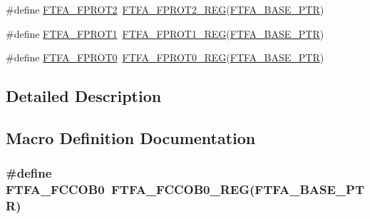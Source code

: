 \begin{DoxyCompactItemize}
\item 
\#define \hyperlink{group___f_t_f_a___register___accessor___macros_ga25a0859e528311bedda3719d80e44a59}{F\+T\+F\+A\+\_\+\+F\+P\+R\+O\+T2}~\hyperlink{group___f_t_f_a___register___accessor___macros_ga35897dbfbff1d92db497e4c553692eda}{F\+T\+F\+A\+\_\+\+F\+P\+R\+O\+T2\+\_\+\+R\+EG}(\hyperlink{group___f_t_f_a___peripheral_ga13ad52f12d5b04e5e01f69ab18ed9216}{F\+T\+F\+A\+\_\+\+B\+A\+S\+E\+\_\+\+P\+TR})
\item 
\#define \hyperlink{group___f_t_f_a___register___accessor___macros_ga6fa22ad27ded5b2e13a5b6dd22d6641d}{F\+T\+F\+A\+\_\+\+F\+P\+R\+O\+T1}~\hyperlink{group___f_t_f_a___register___accessor___macros_gad0a42e1dffbcc9f89f85c147c728fd3e}{F\+T\+F\+A\+\_\+\+F\+P\+R\+O\+T1\+\_\+\+R\+EG}(\hyperlink{group___f_t_f_a___peripheral_ga13ad52f12d5b04e5e01f69ab18ed9216}{F\+T\+F\+A\+\_\+\+B\+A\+S\+E\+\_\+\+P\+TR})
\item 
\#define \hyperlink{group___f_t_f_a___register___accessor___macros_gad1a0d6a372aec4a0f1b41e9f8d45f59b}{F\+T\+F\+A\+\_\+\+F\+P\+R\+O\+T0}~\hyperlink{group___f_t_f_a___register___accessor___macros_gacdd73daa0145621639c5a355bea59886}{F\+T\+F\+A\+\_\+\+F\+P\+R\+O\+T0\+\_\+\+R\+EG}(\hyperlink{group___f_t_f_a___peripheral_ga13ad52f12d5b04e5e01f69ab18ed9216}{F\+T\+F\+A\+\_\+\+B\+A\+S\+E\+\_\+\+P\+TR})
\end{DoxyCompactItemize}


\subsection{Detailed Description}


\subsection{Macro Definition Documentation}
\subsubsection[{\texorpdfstring{F\+T\+F\+A\+\_\+\+F\+C\+C\+O\+B0}{FTFA_FCCOB0}}]{\setlength{\rightskip}{0pt plus 5cm}\#define F\+T\+F\+A\+\_\+\+F\+C\+C\+O\+B0~{\bf F\+T\+F\+A\+\_\+\+F\+C\+C\+O\+B0\+\_\+\+R\+EG}({\bf F\+T\+F\+A\+\_\+\+B\+A\+S\+E\+\_\+\+P\+TR})}\hypertarget{group___f_t_f_a___register___accessor___macros_gabf351100528fd5d4a09bf57c2b9acc40}{}\label{group___f_t_f_a___register___accessor___macros_gabf351100528fd5d4a09bf57c2b9acc40}


